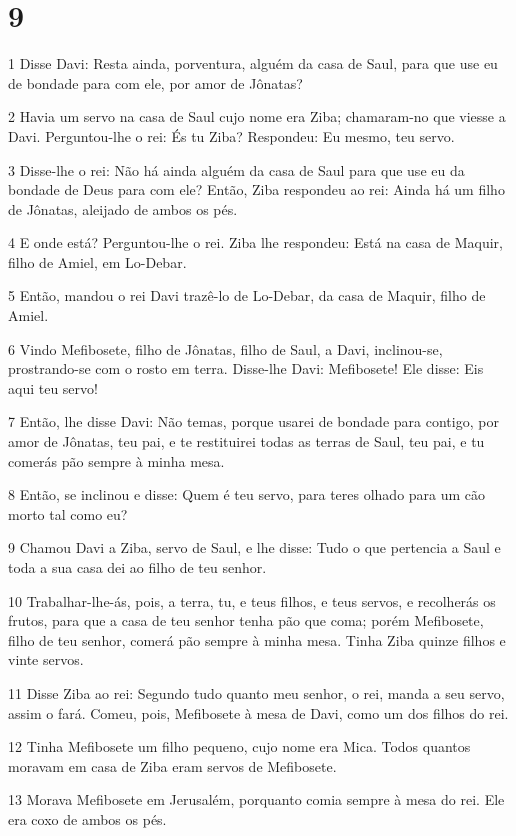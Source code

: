 \chapter{9}

\par 1 Disse Davi: Resta ainda, porventura, alguém da casa de Saul, para que use eu de bondade para com ele, por amor de Jônatas?
\par 2 Havia um servo na casa de Saul cujo nome era Ziba; chamaram-no que viesse a Davi. Perguntou-lhe o rei: És tu Ziba? Respondeu: Eu mesmo, teu servo.
\par 3 Disse-lhe o rei: Não há ainda alguém da casa de Saul para que use eu da bondade de Deus para com ele? Então, Ziba respondeu ao rei: Ainda há um filho de Jônatas, aleijado de ambos os pés.
\par 4 E onde está? Perguntou-lhe o rei. Ziba lhe respondeu: Está na casa de Maquir, filho de Amiel, em Lo-Debar.
\par 5 Então, mandou o rei Davi trazê-lo de Lo-Debar, da casa de Maquir, filho de Amiel.
\par 6 Vindo Mefibosete, filho de Jônatas, filho de Saul, a Davi, inclinou-se, prostrando-se com o rosto em terra. Disse-lhe Davi: Mefibosete! Ele disse: Eis aqui teu servo!
\par 7 Então, lhe disse Davi: Não temas, porque usarei de bondade para contigo, por amor de Jônatas, teu pai, e te restituirei todas as terras de Saul, teu pai, e tu comerás pão sempre à minha mesa.
\par 8 Então, se inclinou e disse: Quem é teu servo, para teres olhado para um cão morto tal como eu?
\par 9 Chamou Davi a Ziba, servo de Saul, e lhe disse: Tudo o que pertencia a Saul e toda a sua casa dei ao filho de teu senhor.
\par 10 Trabalhar-lhe-ás, pois, a terra, tu, e teus filhos, e teus servos, e recolherás os frutos, para que a casa de teu senhor tenha pão que coma; porém Mefibosete, filho de teu senhor, comerá pão sempre à minha mesa. Tinha Ziba quinze filhos e vinte servos.
\par 11 Disse Ziba ao rei: Segundo tudo quanto meu senhor, o rei, manda a seu servo, assim o fará. Comeu, pois, Mefibosete à mesa de Davi, como um dos filhos do rei.
\par 12 Tinha Mefibosete um filho pequeno, cujo nome era Mica. Todos quantos moravam em casa de Ziba eram servos de Mefibosete.
\par 13 Morava Mefibosete em Jerusalém, porquanto comia sempre à mesa do rei. Ele era coxo de ambos os pés.

